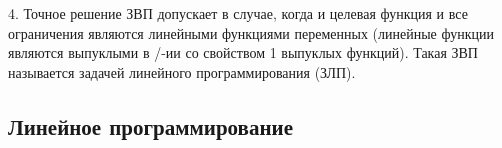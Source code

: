 4. Точное решение ЗВП допускает в случае, когда и целевая функция и все ограничения являются линейными функциями переменных (линейные функции являются выпуклыми в /-ии со свойством 1 выпуклых функций). Такая ЗВП называется задачей линейного программирования (ЗЛП).

\subsection*{Линейное программирование}
